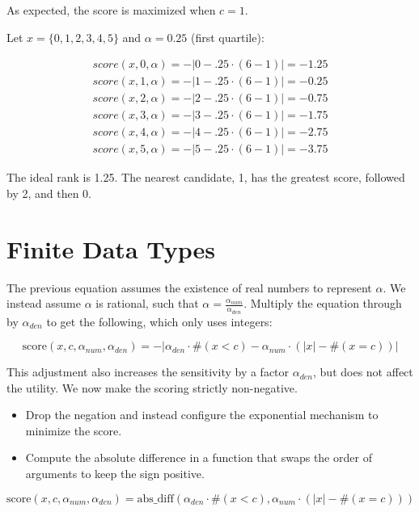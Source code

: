 \documentclass{article}
\begin{document}
As expected, the score is maximized when $c = 1$.

Let $x = \{0,1,2,3,4,5\}$ and $\alpha = 0.25$ (first quartile):

\begin{align*}
    score(x, 0, \alpha) = -|0 - .25 \cdot (6 - 1)| = -1.25 \\
    score(x, 1, \alpha) = -|1 - .25 \cdot (6 - 1)| = -0.25 \\
    score(x, 2, \alpha) = -|2 - .25 \cdot (6 - 1)| = -0.75 \\
    score(x, 3, \alpha) = -|3 - .25 \cdot (6 - 1)| = -1.75 \\
    score(x, 4, \alpha) = -|4 - .25 \cdot (6 - 1)| = -2.75 \\
    score(x, 5, \alpha) = -|5 - .25 \cdot (6 - 1)| = -3.75
\end{align*}

The ideal rank is 1.25. The nearest candidate, 1, has the greatest score, followed by 2, and then 0. 


\section{Finite Data Types}
The previous equation assumes the existence of real numbers to represent $\alpha$.
We instead assume $\alpha$ is rational, such that $\alpha = \frac{\alpha_{num}}{\alpha_{den}}$.
Multiply the equation through by $\alpha_{den}$ to get the following, 
which only uses integers:

\begin{equation}
    \textrm{score}(x, c, \alpha_{num}, \alpha_{den}) = -|\alpha_{den} \cdot \#(x < c) - \alpha_{num} \cdot (|x| - \#(x = c))|
\end{equation}

This adjustment also increases the sensitivity by a factor $\alpha_{den}$, 
but does not affect the utility.
We now make the scoring strictly non-negative.
\begin{itemize}
    \item Drop the negation and instead configure the exponential mechanism to minimize the score.
    \item Compute the absolute difference in a function that swaps the order of arguments to keep the sign positive.
\end{itemize}

\begin{equation}
    \textrm{score}(x, c, \alpha_{num}, \alpha_{den}) = \mathrm{abs\_diff}(\alpha_{den} \cdot \#(x < c), \alpha_{num} \cdot (|x| - \#(x = c)))
\end{equation}
\end{document}
